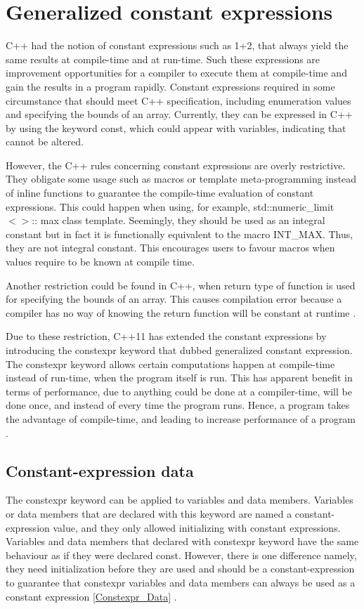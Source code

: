 \documentclass[11pt]{report}
\begin{document}
\section{Generalized constant expressions}
\label{section: Generalized constant expressions}
C++ had the notion of constant expressions such as 1+2, that always yield the same results at compile-time and at run-time. Such these expressions are improvement opportunities for a compiler to execute them at compile-time and gain the results in a program rapidly. Constant expressions required in some circumstance that should meet C++ specification, including enumeration values and specifying the bounds of an array. Currently, they can be expressed in C++ by using the keyword const, which could appear with variables, indicating that cannot be altered.


However, the C++ rules concerning constant expressions are overly restrictive. They obligate some usage such as macros or template meta-programming instead of inline functions to guarantee the compile-time evaluation of constant expressions. This could happen when using, for example, std::numeric\_limit$<>$:: max  class template.  Seemingly, they should be used as an integral constant but in fact it is functionally equivalent to the macro INT\_MAX. Thus, they are not integral constant. This encourages users to favour macros when values require to be known at compile time.


Another restriction could be found in C++, when return type of function is used for specifying the bounds of an array. This causes compilation error because a compiler has no way of knowing the return function will be constant at runtime \cite{Stroustrup:2012:Cpp11}. 


Due to these restriction, C++11 has extended the constant expressions by introducing the constexpr keyword that dubbed generalized constant expression. The constexpr keyword allows certain computations happen at compile-time instead of run-time, when the program itself is run.  This has apparent benefit in terms of performance, due to anything could be done at a compiler-time, will be done once, and instead of every time the program runs. Hence, a program takes the advantage of compile-time, and leading to increase performance of a program \cite{Williams:2012:CCA}.

\subsection{Constant-expression data}
\label{subsection: constant-expression data}
The constexpr keyword can be applied to variables and data members.  Variables or data members that are declared with this keyword are named a constant-expression value, and they only allowed initializing with constant expressions. Variables and data members that declared with constexpr keyword have the same behaviour as if they were declared const. However, there is one difference namely, they need initialization before they are used and should be a constant-expression to guarantee that constexpr variables and data members can always be used as a constant expression \ref{Constexpr_Data} \cite{Williams:2012:CCA}.
\end{document}
